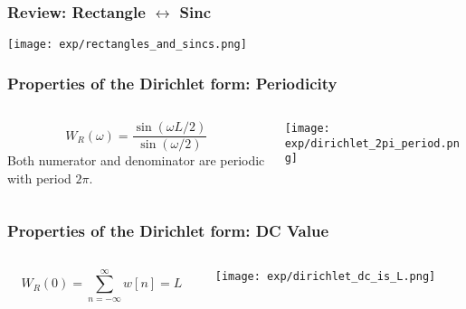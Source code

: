 \documentclass{beamer}
\begin{document}
\begin{frame}
  \frametitle{Review: Rectangle $\leftrightarrow$ Sinc}

  \centerline{\texttt{[image: exp/rectangles\_and\_sincs.png]}}
\end{frame}

\begin{frame}
  \frametitle{Properties of the Dirichlet form: Periodicity}

  \begin{columns}
    \begin{column}{0.5\textwidth}

      \begin{displaymath}
        W_R(\omega) = \frac{\sin(\omega L/2)}{\sin(\omega/2)}
      \end{displaymath}
      Both numerator and denominator are periodic with period $2\pi$.
    \end{column}
    \begin{column}{0.5\textwidth}
      \centerline{\texttt{[image: exp/dirichlet\_2pi\_period.png]}}
    \end{column}
  \end{columns}
\end{frame}

\begin{frame}
  \frametitle{Properties of the Dirichlet form: DC Value}

  \begin{columns}
    \begin{column}{0.5\textwidth}

      \begin{displaymath}      
        W_R(0) = \sum_{n=-\infty}^\infty w[n] = L
      \end{displaymath}
      
    \end{column}
    \begin{column}{0.5\textwidth}
      \centerline{\texttt{[image: exp/dirichlet\_dc\_is\_L.png]}}
    \end{column}
  \end{columns}
\end{frame}
\end{document}
